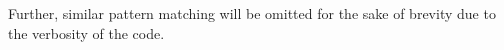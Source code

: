 {\begin{code}
\AgdaSymbol{\AgdaDottedPattern{(}}\AgdaSpace{}%
\AgdaOperator{\AgdaInductiveConstructor{\AgdaDottedPattern{,}}}\AgdaSpace{}%
\AgdaSymbol{\AgdaDottedPattern{)}}\AgdaSpace{}%
\AgdaSpace{}%
\AgdaInductiveConstructor{\AgdaDottedPattern{[]}}\AgdaSymbol{\AgdaDottedPattern{)}}\AgdaSymbol{)}\<%
\\
\>[.]\<[3109I]%
\>[24]\AgdaSymbol{(}\AgdaSpace{}%
\AgdaSymbol{(}\AgdaSpace{}%
\AgdaSymbol{(}\AgdaSpace{}%
\AgdaSymbol{())))}\<%
\\
%
\>[24]\<%
\end{code}

Further, similar pattern matching will be omitted for the sake of brevity due to the verbosity of the code.

}

